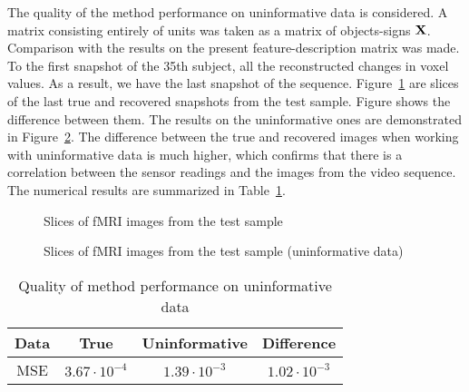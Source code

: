 \documentclass{article}
\begin{document}
The quality of the method performance on uninformative data is considered.
A matrix consisting entirely of units was taken as a matrix of objects-signs $\mathbf{X}$.
Comparison with the results on the present feature-description matrix was made.
To the first snapshot of the 35th subject, all the reconstructed
changes in voxel values.
As a result, we have the last snapshot of the sequence. Figure~\ref{fig:recover}
are slices of the last true and recovered snapshots from the test sample.
Figure shows the difference between them.
The results on the uninformative ones are demonstrated in Figure~\ref{fig:random}.
The difference between the true and recovered images when working with uninformative data
is much higher, which confirms that there is a correlation between the sensor readings and the
images from the video sequence. The numerical results are summarized in Table~\ref{table:random}.

\begin{figure}[h!]
	\centering
	\hfill
	\hfill
	\caption{Slices of fMRI images from the test sample}
	\label{fig:recover}
\end{figure}

\begin{figure}[h!]
	\centering
	\hfill
	\hfill
	\caption{Slices of fMRI images from the test sample (uninformative data)}
	\label{fig:random}
\end{figure}

\begin{table}[h!]
	\centering
	\caption{Quality of method performance on uninformative data}
	\begin{tabular}{|c|c|c|c|}
		\hline
		Data & True          & Uninformative & Difference \\ \hline \hline
		MSE     & $3.67 \cdot 10^{-4}$ & $1.39 \cdot 10^{-3}$ & $1.02 \cdot 10^{-3}$ \\ \hline
	\end{tabular}
	\label{table:random}
\end{table}
\end{document}
